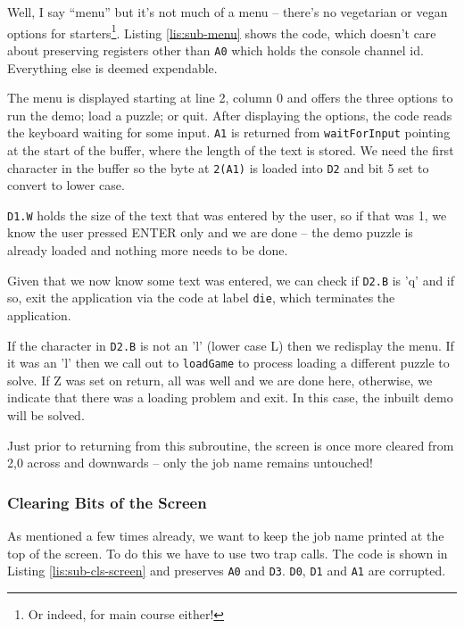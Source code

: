 Well, I say ``menu'' but it's not much of a menu -- there's no
vegetarian or vegan options for starters\footnote{Or indeed, for main course either!}.
Listing \ref{lis:sub-menu} shows the code, which doesn't care about
preserving registers other than \texttt{A0} which holds the console
channel id. Everything else is deemed expendable.

The menu is displayed starting at line 2, column 0 and offers the
three options to run the demo; load a puzzle; or quit. After displaying
the options, the code reads the keyboard waiting for some input. \texttt{A1}
is returned from \texttt{waitForInput} pointing at the start of the
buffer, where the length of the text is stored. We need the first
character in the buffer so the byte at \texttt{2(A1)} is loaded into
\texttt{D2} and bit 5 set to convert to lower case.

\texttt{D1.W} holds the size of the text that was entered by the user,
so if that was 1, we know the user pressed ENTER only and we are done
-- the demo puzzle is already loaded and nothing more needs to be
done.



Given that we now know some text was entered, we can check if \texttt{D2.B}
is 'q' and if so, exit the application via the code at label \texttt{die},
which terminates the application.

If the character in \texttt{D2.B} is not an 'l' (lower case L) then
we redisplay the menu. If it was an 'l' then we call out to \texttt{loadGame}
to process loading a different puzzle to solve. If Z was set on return,
all was well and we are done here, otherwise, we indicate that there
was a loading problem and exit. In this case, the inbuilt demo will
be solved.

Just prior to returning from this subroutine, the screen is once more
cleared from 2,0 across and downwards -- only the job name remains
untouched!

\subsubsection{Clearing Bits of the Screen}

As mentioned a few times already, we want to keep the job name printed
at the top of the screen. To do this we have to use two trap calls.
The code is shown in Listing \ref{lis:sub-cls-screen} and preserves
\texttt{A0} and \texttt{D3}. \texttt{D0}, \texttt{D1} and \texttt{A1}
are corrupted.

